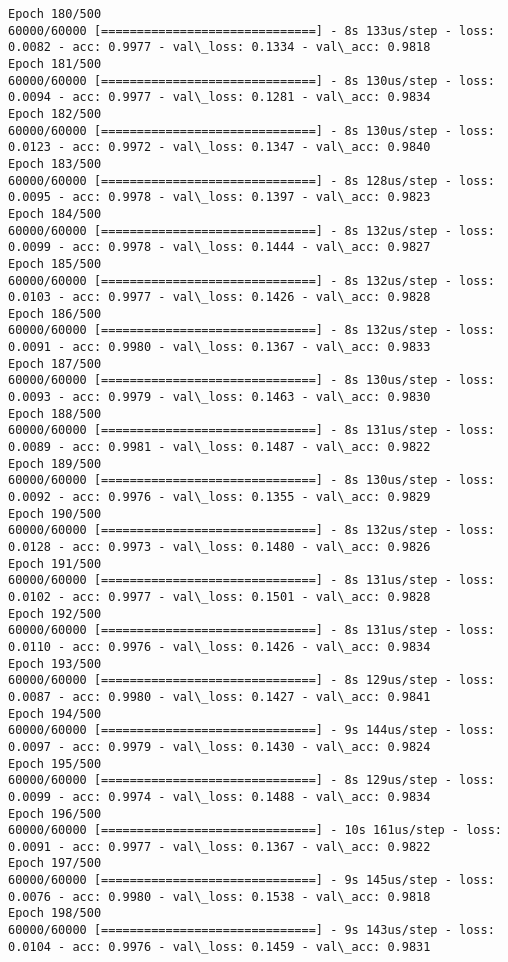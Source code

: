 \documentclass[11pt]{article}
\begin{document}
\begin{Verbatim}[commandchars=\\\{\}]
Epoch 180/500
60000/60000 [==============================] - 8s 133us/step - loss: 0.0082 - acc: 0.9977 - val\_loss: 0.1334 - val\_acc: 0.9818
Epoch 181/500
60000/60000 [==============================] - 8s 130us/step - loss: 0.0094 - acc: 0.9977 - val\_loss: 0.1281 - val\_acc: 0.9834
Epoch 182/500
60000/60000 [==============================] - 8s 130us/step - loss: 0.0123 - acc: 0.9972 - val\_loss: 0.1347 - val\_acc: 0.9840
Epoch 183/500
60000/60000 [==============================] - 8s 128us/step - loss: 0.0095 - acc: 0.9978 - val\_loss: 0.1397 - val\_acc: 0.9823
Epoch 184/500
60000/60000 [==============================] - 8s 132us/step - loss: 0.0099 - acc: 0.9978 - val\_loss: 0.1444 - val\_acc: 0.9827
Epoch 185/500
60000/60000 [==============================] - 8s 132us/step - loss: 0.0103 - acc: 0.9977 - val\_loss: 0.1426 - val\_acc: 0.9828
Epoch 186/500
60000/60000 [==============================] - 8s 132us/step - loss: 0.0091 - acc: 0.9980 - val\_loss: 0.1367 - val\_acc: 0.9833
Epoch 187/500
60000/60000 [==============================] - 8s 130us/step - loss: 0.0093 - acc: 0.9979 - val\_loss: 0.1463 - val\_acc: 0.9830
Epoch 188/500
60000/60000 [==============================] - 8s 131us/step - loss: 0.0089 - acc: 0.9981 - val\_loss: 0.1487 - val\_acc: 0.9822
Epoch 189/500
60000/60000 [==============================] - 8s 130us/step - loss: 0.0092 - acc: 0.9976 - val\_loss: 0.1355 - val\_acc: 0.9829
Epoch 190/500
60000/60000 [==============================] - 8s 132us/step - loss: 0.0128 - acc: 0.9973 - val\_loss: 0.1480 - val\_acc: 0.9826
Epoch 191/500
60000/60000 [==============================] - 8s 131us/step - loss: 0.0102 - acc: 0.9977 - val\_loss: 0.1501 - val\_acc: 0.9828
Epoch 192/500
60000/60000 [==============================] - 8s 131us/step - loss: 0.0110 - acc: 0.9976 - val\_loss: 0.1426 - val\_acc: 0.9834
Epoch 193/500
60000/60000 [==============================] - 8s 129us/step - loss: 0.0087 - acc: 0.9980 - val\_loss: 0.1427 - val\_acc: 0.9841
Epoch 194/500
60000/60000 [==============================] - 9s 144us/step - loss: 0.0097 - acc: 0.9979 - val\_loss: 0.1430 - val\_acc: 0.9824
Epoch 195/500
60000/60000 [==============================] - 8s 129us/step - loss: 0.0099 - acc: 0.9974 - val\_loss: 0.1488 - val\_acc: 0.9834
Epoch 196/500
60000/60000 [==============================] - 10s 161us/step - loss: 0.0091 - acc: 0.9977 - val\_loss: 0.1367 - val\_acc: 0.9822
Epoch 197/500
60000/60000 [==============================] - 9s 145us/step - loss: 0.0076 - acc: 0.9980 - val\_loss: 0.1538 - val\_acc: 0.9818
Epoch 198/500
60000/60000 [==============================] - 9s 143us/step - loss: 0.0104 - acc: 0.9976 - val\_loss: 0.1459 - val\_acc: 0.9831

\end{Verbatim}
\end{document}
